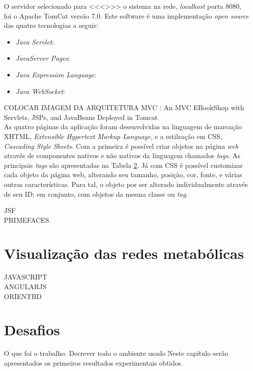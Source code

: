 \indent O servidor selecionado para <<<>>> o sistema na rede, \textit{localhost} porta 8080, foi o Apache TomCat versão 7.0. Este software é uma implementação \textit{open source} das quatro tecnologias \cite{oracle14} a seguir:
\begin{itemize}
	\item \textit{Java Servlet}: 
	\item \textit{JavaServer Pages}:
	\item \textit{Java Expression Language}:
	\item \textit{Java WebSocket}:
\end{itemize}

\indent COLOCAR IMAGEM DA ARQUITETURA MVC : An MVC EBookShop with Servlets, JSPs, and JavaBeans Deployed in Tomcat  \cite{chuan11} \\

\indent As quatro páginas da aplicação foram desenvolvidas na linguagem de marcação XHTML, \textit{Extensible Hypertext Markup Language}, e a estilzação em CSS, \textit{Cascading Style Sheets}. Com a primeira é possível criar objetos na página \textit{web} através de componentes nativos e não nativos da linguagem chamados \textit{tags}. As principais \textit{tags} são apresentadas na Tabela \ref{}. Já com CSS é possível customizar cada objeto da página web, alterando seu tamanho, posição, cor, fonte, e várias outras características. Para tal, o objeto por ser alterado individualmente através de seu ID; em conjunto, com objetos da mesma classe ou \textit{tag}.

\indent 

JSF \\
PRIMEFACES

\section{Visualização das redes metabólicas}

JAVASCRIPT \\
ANGULARJS \\
ORIENTBD

\section{Desafios}
 

O que foi o trabalho. 
Decrever todo o ambiente usado
Neste capítulo serão apresentados os primeiros resultados experimentais obtidos.
